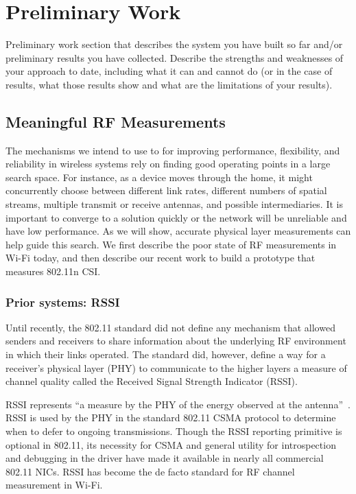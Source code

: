 \section{Preliminary Work}
Preliminary work section that describes the system you have built so
far and/or preliminary results you have collected. Describe the
strengths and weaknesses of your approach to date, including what it can
and cannot do (or in the case of results, what those results show and
what are the limitations of your results).

\subsection{Meaningful RF Measurements}
The mechanisms we intend to use to for improving performance, flexibility, and reliability in wireless systems rely on finding good operating points in a large search space. For instance, as a device moves through the home, it might concurrently choose between different link rates, different numbers of spatial streams, multiple transmit or receive antennas, and possible intermediaries. It is important to converge to a solution quickly or the network will be unreliable and have low performance. As we will show, accurate physical layer measurements can help guide this search. We first describe the poor state of RF measurements in Wi-Fi today, and then describe our recent work to build a prototype that measures 802.11n CSI.

\subsubsection{Prior systems: RSSI}
Until recently, the 802.11 standard did not define any mechanism that allowed senders and receivers to share information about the underlying RF environment in which their links operated. The standard did, however, define a way for a receiver's physical layer (PHY) to communicate to the higher layers a measure of channel quality called the Received Signal Strength Indicator (RSSI).

RSSI represents ``a measure by the PHY of the energy observed at the antenna''~\cite[\S14.2.3.2]{80211}. RSSI is used by the PHY in the standard 802.11 CSMA protocol to determine when to defer to ongoing transmissions. Though the RSSI reporting primitive is optional in 802.11, its necessity for CSMA and general utility for introspection and debugging in the driver have made it available in nearly all commercial 802.11 NICs. RSSI has become the de facto standard for RF channel measurement in Wi-Fi.

